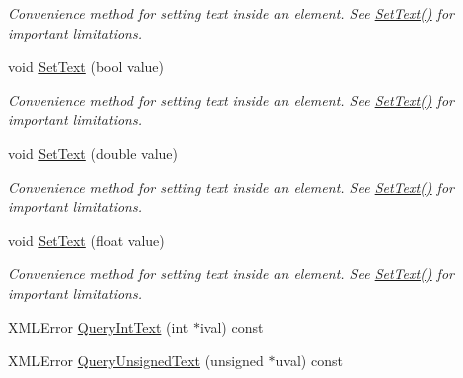 \begin{DoxyCompactItemize}
\begin{DoxyCompactList}\small\item\em Convenience method for setting text inside an element. See \hyperlink{classtinyxml2_1_1XMLElement_a1f9c2cd61b72af5ae708d37b7ad283ce}{Set\+Text()} for important limitations. \end{DoxyCompactList}\item 
void \hyperlink{classtinyxml2_1_1XMLElement_ae4b543d6770de76fb6ab68e541c192a4}{Set\+Text} (bool value)\hypertarget{classtinyxml2_1_1XMLElement_ae4b543d6770de76fb6ab68e541c192a4}{}\label{classtinyxml2_1_1XMLElement_ae4b543d6770de76fb6ab68e541c192a4}

\begin{DoxyCompactList}\small\item\em Convenience method for setting text inside an element. See \hyperlink{classtinyxml2_1_1XMLElement_a1f9c2cd61b72af5ae708d37b7ad283ce}{Set\+Text()} for important limitations. \end{DoxyCompactList}\item 
void \hyperlink{classtinyxml2_1_1XMLElement_a67bd77ac9aaeff58ff20b4275a65ba4e}{Set\+Text} (double value)\hypertarget{classtinyxml2_1_1XMLElement_a67bd77ac9aaeff58ff20b4275a65ba4e}{}\label{classtinyxml2_1_1XMLElement_a67bd77ac9aaeff58ff20b4275a65ba4e}

\begin{DoxyCompactList}\small\item\em Convenience method for setting text inside an element. See \hyperlink{classtinyxml2_1_1XMLElement_a1f9c2cd61b72af5ae708d37b7ad283ce}{Set\+Text()} for important limitations. \end{DoxyCompactList}\item 
void \hyperlink{classtinyxml2_1_1XMLElement_a51d560da5ae3ad6b75e0ab9ffb2ae42a}{Set\+Text} (float value)\hypertarget{classtinyxml2_1_1XMLElement_a51d560da5ae3ad6b75e0ab9ffb2ae42a}{}\label{classtinyxml2_1_1XMLElement_a51d560da5ae3ad6b75e0ab9ffb2ae42a}

\begin{DoxyCompactList}\small\item\em Convenience method for setting text inside an element. See \hyperlink{classtinyxml2_1_1XMLElement_a1f9c2cd61b72af5ae708d37b7ad283ce}{Set\+Text()} for important limitations. \end{DoxyCompactList}\item 
X\+M\+L\+Error \hyperlink{classtinyxml2_1_1XMLElement_a71327c9a9d8840562bd204f46d0a7189}{Query\+Int\+Text} (int $\ast$ival) const 
\item 
X\+M\+L\+Error \hyperlink{classtinyxml2_1_1XMLElement_a2192091dec0c06be8b14f4e912c01758}{Query\+Unsigned\+Text} (unsigned $\ast$uval) const \hypertarget{classtinyxml2_1_1XMLElement_a2192091dec0c06be8b14f4e912c01758}{}\label{classtinyxml2_1_1XMLElement_a2192091dec0c06be8b14f4e912c01758}


\end{DoxyCompactItemize}
